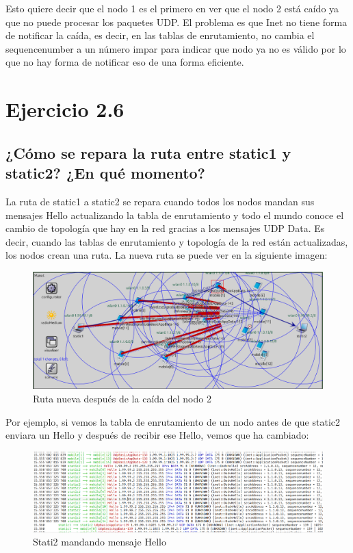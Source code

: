 Esto quiere decir que el nodo 1 es el primero en ver que el nodo 2 está caído ya que no puede procesar los paquetes UDP. El problema es que Inet no tiene forma de notificar la caída, es decir, en las tablas de enrutamiento, no cambia el sequencenumber a un número impar para indicar que nodo ya no es válido por lo que no hay forma de notificar eso de una forma eficiente.



\section{Ejercicio 2.6}

\subsection{¿Cómo se repara la ruta entre static1 y static2? ¿En qué momento?}

La ruta de static1 a static2 se repara cuando todos los nodos mandan sus mensajes Hello actualizando la tabla de enrutamiento y todo el mundo conoce el cambio de topología que hay en la red gracias a los mensajes UDP Data. Es decir, cuando las tablas de enrutamiento y topología de la red están actualizadas, los nodos crean una ruta. La nueva ruta se puede ver en la siguiente imagen:

\begin{figure}[H]
    \centering
    \includegraphics[width=115mm, scale=0.75]{imaxes/dsdv/ejercicio2_6.png}
    \caption{Ruta nueva después de la caída del nodo 2}
    \label{fig:ejer2_6}
\end{figure}

Por ejemplo, si vemos la tabla de enrutamiento de un nodo antes de que static2 enviara un Hello y después de recibir ese Hello, vemos que ha cambiado:

\begin{figure}[H]
    \centering
    \includegraphics[width=145mm, scale=0.75]{imaxes/dsdv/ejercicio2_6_1.png}
    \caption{Stati2 mandando mensaje Hello}
    \label{fig:ejer2_6_1}
\end{figure}

